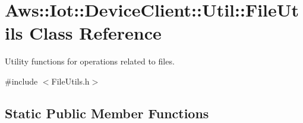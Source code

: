 \hypertarget{class_aws_1_1_iot_1_1_device_client_1_1_util_1_1_file_utils}{}\section{Aws\+:\+:Iot\+:\+:Device\+Client\+:\+:Util\+:\+:File\+Utils Class Reference}
\label{class_aws_1_1_iot_1_1_device_client_1_1_util_1_1_file_utils}


Utility functions for operations related to files.  




{\ttfamily \#include $<$File\+Utils.\+h$>$}

\subsection*{Static Public Member Functions}

